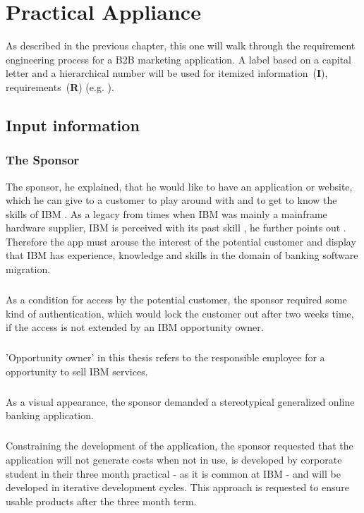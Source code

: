 \chapter{Practical Appliance}
As described in the previous chapter, this one will walk through the requirement engineering process for a B2B marketing application. A label based on a capital letter and a hierarchical number will be used for itemized \mbox{information (\textbf{I})}, \mbox{requirements (\textbf{R})} (e.g. ).
\section{Input information}
\subsection{The Sponsor}
The sponsor, he explained, that he would like to have an application or website, which he can give to a customer to play around with and to get to know the skills of IBM \parencite{Sachs.20.04.2017b}. As a legacy from times when IBM was mainly a mainframe hardware supplier, IBM is perceived with its past skill , he further points out \parencite{Sachs.20.04.2017b}. Therefore the app must arouse the interest of the potential customer and display that IBM has experience, knowledge and skills in the domain of banking software migration. 

\paragraph{} As a condition for access by the potential customer, the sponsor required some kind of authentication, which would lock the customer out after two weeks time, if the access is not extended by an IBM opportunity owner.

\paragraph{} 'Opportunity owner' in this thesis refers to the responsible employee for a opportunity to sell IBM services.

\paragraph{} As a visual appearance, the sponsor demanded a stereotypical generalized online banking application.

\paragraph{} Constraining the development of the application, the sponsor requested that the application will not generate costs when not in use, is developed by corporate student in their three month practical - as it is common at IBM - and will be developed in iterative development cycles. This approach is requested to ensure usable products after the three month term.

